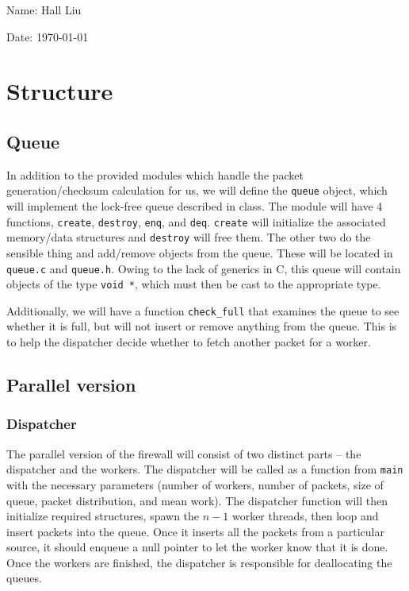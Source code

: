 \documentclass{article}
\begin{document}
Name: Hall Liu

Date: \today 
\vspace{1.5cm}

\section*{Structure}
\subsection*{Queue}
In addition to the provided modules which handle the packet generation/checksum calculation for us, we will define the \verb|queue| object, which will implement the lock-free queue described in class. The module will have 4 functions, \verb|create|, \verb|destroy|, \verb|enq|, and \verb|deq|. \verb|create| will initialize the associated memory/data structures and \verb|destroy| will free them. The other two do the sensible thing and add/remove objects from the queue. These will be located in \verb|queue.c| and \verb|queue.h|. Owing to the lack of generics in C, this queue will contain objects of the type \verb|void *|, which must then be cast to the appropriate type. 

Additionally, we will have a function \verb|check_full| that examines the queue to see whether it is full, but will not insert or remove anything from the queue. This is to help the dispatcher decide whether to fetch another packet for a worker.
\subsection*{Parallel version}
\subsubsection*{Dispatcher}
The parallel version of the firewall will consist of two distinct parts -- the dispatcher and the workers. The dispatcher will be called as a function from \verb|main| with the necessary parameters (number of workers, number of packets, size of queue, packet distribution, and mean work).  The dispatcher function will then initialize required structures, spawn the $n-1$ worker threads, then loop and insert packets into the queue. Once it inserts all the packets from a particular source, it should enqueue a null pointer to let the worker know that it is done. Once the workers are finished, the dispatcher is responsible for deallocating the queues.

\end{document}
